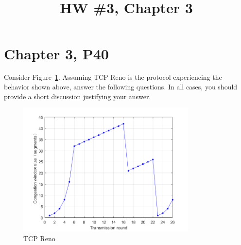 \documentclass{cshwk}
\title{HW \#3, Chapter 3}
\begin{document}
\maketitle

\section*{Chapter 3, P40}

Consider Figure~\ref{fig:tcp-reno}. Assuming TCP Reno is the protocol experiencing the behavior shown above, answer the following questions. In all cases, you should provide a short discussion justifying your answer.

\begin{figure}[htbp]
    \centering
    \includegraphics[width=0.8\textwidth]{hw3-5-1.png}
    \caption{TCP Reno}
    \label{fig:tcp-reno}
\end{figure}
\end{document}
